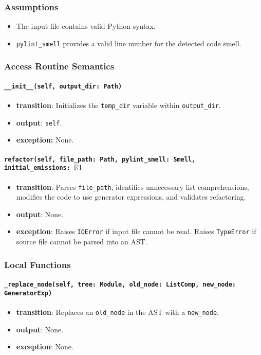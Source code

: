 \documentclass[12pt, titlepage]{article}
\begin{document}
\subsubsection{Assumptions}
\begin{itemize}
  \item The input file contains valid Python syntax.
  \item \texttt{pylint\_smell} provides a valid line number for the detected code smell.
\end{itemize}

\subsubsection{Access Routine Semantics}

\paragraph{\texttt{\_\_init\_\_(self, output\_dir: Path)}}
\begin{itemize}
  \item \textbf{transition}: Initializes the \texttt{temp\_dir} variable within \texttt{output\_dir}.
  \item \textbf{output}: \texttt{self}.
  \item \textbf{exception:} None.
\end{itemize}

\paragraph{\texttt{refactor(self, file\_path: Path, pylint\_smell: Smell, initial\_emissions: $\mathbb{R}$)}}
\begin{itemize}
  \item \textbf{transition}: Parses \texttt{file\_path}, identifies unnecessary list comprehensions, modifies the code to use generator expressions, and validates refactoring.
  \item \textbf{output}: None.
  \item \textbf{exception}: Raises \texttt{IOError} if input file cannot be read. Raises \texttt{TypeError} if source file cannot be parsed into an AST.
\end{itemize}

\subsubsection{Local Functions}
\paragraph{\texttt{\_replace\_node(self, tree: Module, old\_node: ListComp, new\_node: GeneratorExp)}}
\begin{itemize}
  \item \textbf{transition}: Replaces an \texttt{old\_node} in the AST with a \texttt{new\_node}.
  \item \textbf{output}: None.
  \item \textbf{exception}: None.
\end{itemize}
\end{document}
